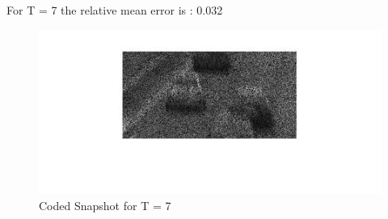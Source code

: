 \documentclass{article}
\begin{document}
\newpage
For T = 7 the relative mean error is : 0.032
\begin{figure}[!htb]
\centering
\includegraphics[width=1\textwidth]{t7/coded.jpg}
\caption{Coded Snapshot for T = 7}
\end{figure}
\end{document}
